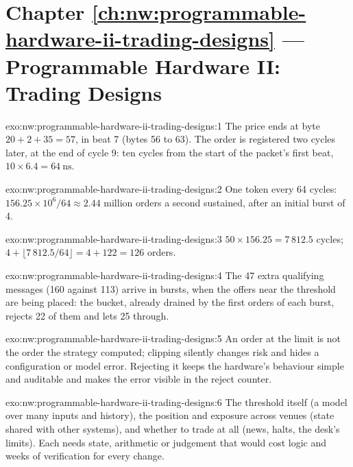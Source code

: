 \section*{Chapter \ref{ch:nw:programmable-hardware-ii-trading-designs} --- Programmable Hardware II: Trading Designs}

\begin{solution}{exo:nw:programmable-hardware-ii-trading-designs:1}
The price ends at byte $20 + 2 + 35 = 57$, in beat 7 (bytes 56 to 63). The order is registered two cycles later, at the end of cycle 9:
ten cycles from the start of the packet's first beat, $10 \times 6.4 = \qty{64}{\nano\second}$.
\end{solution}

\begin{solution}{exo:nw:programmable-hardware-ii-trading-designs:2}
One token every 64 cycles: $156.25 \times 10^6 / 64 \approx 2.44$ million orders a second sustained, after an initial burst of 4.
\end{solution}

\begin{solution}{exo:nw:programmable-hardware-ii-trading-designs:3}
$50 \times 156.25 = 7\,812.5$ cycles; $4 + \lfloor 7\,812.5 / 64\rfloor = 4 + 122 = 126$ orders.
\end{solution}

\begin{solution}{exo:nw:programmable-hardware-ii-trading-designs:4}
The 47 extra qualifying messages (160 against 113) arrive in bursts, when the offers near the threshold are being placed: the bucket, already
drained by the first orders of each burst, rejects 22 of them and lets 25 through.
\end{solution}

\begin{solution}{exo:nw:programmable-hardware-ii-trading-designs:5}
An order at the limit is not the order the strategy computed; clipping silently changes risk and hides a configuration or model error.
Rejecting it keeps the hardware's behaviour simple and auditable and makes the error visible in the reject counter.
\end{solution}

\begin{solution}{exo:nw:programmable-hardware-ii-trading-designs:6}
The threshold itself (a model over many inputs and history), the position and exposure across venues (state shared with other systems),
and whether to trade at all (news, halts, the desk's limits). Each needs state, arithmetic or judgement that would cost logic and weeks of
verification for every change.
\end{solution}

